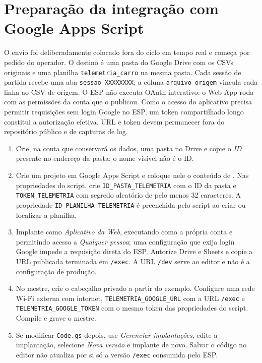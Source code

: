 \section{Preparação da integração com Google Apps Script}\label{sec:google_config}
O envio foi deliberadamente colocado fora do ciclo em tempo real e começa por pedido do operador. O destino é uma pasta do Google Drive com os CSVs originais e uma planilha \texttt{telemetria\_carro} na mesma pasta. Cada sessão de partida recebe uma aba \texttt{sessao\_XXXXXXXX}; a coluna \texttt{arquivo\_origem} vincula cada linha ao CSV de origem. O ESP não executa OAuth interativo: o Web App roda com as permissões da conta que o publicou. Como o acesso do aplicativo precisa permitir requisições sem login Google no ESP, um token compartilhado longo constitui a autorização efetiva. URL e token devem permanecer fora do repositório público e de capturas de log.

\begin{enumerate}
\item Crie, na conta que conservará os dados, uma pasta no Drive e copie o \emph{ID} presente no endereço da pasta; o nome visível não é o ID.
\item Crie um projeto em Google Apps Script e coloque nele o conteúdo de . Nas propriedades do script, crie \texttt{ID\_PASTA\_TELEMETRIA} com o ID da pasta e \texttt{TOKEN\_TELEMETRIA} com segredo aleatório de pelo menos 32 caracteres. A propriedade \texttt{ID\_PLANILHA\_TELEMETRIA} é preenchida pelo script ao criar ou localizar a planilha.
\item Implante como \emph{Aplicativo da Web}, executando como a própria conta e permitindo acesso a \emph{Qualquer pessoa}; uma configuração que exija login Google impede a requisição direta do ESP. Autorize Drive e Sheets e copie a URL publicada terminada em \texttt{/exec}. A URL \texttt{/dev} serve ao editor e não é a configuração de produção.
\item No mestre, crie o cabeçalho privado  a partir do exemplo. Configure uma rede Wi-Fi externa com internet, \texttt{TELEMETRIA\_GOOGLE\_URL} com a URL \texttt{/exec} e \texttt{TELEMETRIA\_GOOGLE\_TOKEN} com o mesmo token das propriedades do script. Compile e grave o mestre.
\item Se modificar \texttt{Code.gs} depois, use \emph{Gerenciar implantações}, edite a implantação, selecione \emph{Nova versão} e implante de novo. Salvar o código no editor não atualiza por si só a versão \texttt{/exec} consumida pelo ESP.
\end{enumerate}

